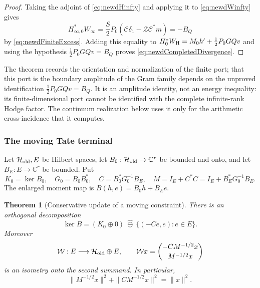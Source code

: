 \documentclass[11pt]{amsart}
\newtheorem{theorem}{Theorem}[section]
\theoremstyle{definition}
\theoremstyle{remark}
\newcommand{\C}{\mathbb C}
\begin{document}
\begin{proof}
Taking the adjoint of \eqref{eq:newdHinfty} and applying it to
\eqref{eq:newdWinfty} gives
\[
 H_{\infty,0}^*W_\infty
 =\frac S2P_0
   (\mathscr C\delta_1-\mathscr Z\mathscr C^*m)
 =-B_Q
\]
by \eqref{eq:newdFiniteExcess}.  Adding this equality to
$H_0^*W_{\rm H}=M_0h'+\tfrac12P_0GQv$ and using the hypothesis
$\tfrac12P_0GQv=B_Q$ proves
\eqref{eq:newdCompletedDivergence}.
\end{proof}

The theorem records the orientation and normalization of the finite port;
that this port is the boundary amplitude of the Gram family depends on the
unproved identification \(\tfrac12P_0GQv=B_Q\).  It is an amplitude identity, not an energy inequality: its
finite-dimensional port cannot be identified with the complete
infinite-rank Hodge factor.  The continuum realization below uses it only
for the arithmetic cross-incidence that it computes.

\subsubsection{The moving Tate terminal}

Let $\mathcal H_{\rm old},E$ be Hilbert spaces, let $B_0:\mathcal H_{\rm old}\to\C^r$ be bounded and onto,
and let $B_E:E\to\C^r$ be bounded.  Put
\begin{equation}\label{eq:newdMovingData}
 K_0=\ker B_0,
 \quad G_0=B_0B_0^*,
 \quad C=B_0^*G_0^{-1}B_E,
 \quad M=I_E+C^*C=I_E+B_E^*G_0^{-1}B_E.
\end{equation}
The enlarged moment map is $B(h,e)=B_0h+B_Ee$.

\begin{theorem}[Conservative update of a moving constraint]
\label{thm:newdMovingConstraint}
There is an orthogonal decomposition
\begin{equation}\label{eq:newdMovingDecomposition}
 \ker B=(K_0\oplus0)\ \widehat\oplus\
          \{(-Ce,e):e\in E\}.
\end{equation}
Moreover
\begin{equation}\label{eq:newdMovingIsometry}
 \mathcal W:E\longrightarrow \mathcal H_{\rm old}\oplus E,
 \qquad
 \mathcal Wx=\binom{-CM^{-1/2}x}{M^{-1/2}x}
\end{equation}
is an isometry onto the second summand.  In particular,
\begin{equation}\label{eq:newdMovingConservation}
 \|M^{-1/2}x\|^2+\|CM^{-1/2}x\|^2=\|x\|^2.
\end{equation}
\end{theorem}
\end{document}

